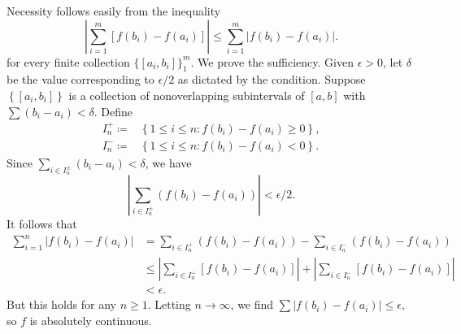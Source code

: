 \begin{exercise}{7.7}
  Necessity follows easily from the inequality
  \[
    \left| \sum_{i=1}^m \left[ f(b_i) - f(a_i) \right] \right|
    \le \sum_{i=1}^m \left| f(b_i) - f(a_i) \right|.
  \]
  for every finite collection $\{[a_i, b_i]\}_1^m$. 
  We prove the sufficiency.
  Given $\epsilon > 0$,
  let $\delta$ be the value corresponding to $\epsilon/2$
  as dictated by the condition.
  Suppose $\left\{ [a_i, b_i] \right\}$ is a collection of
  nonoverlapping subintervals of $[a, b]$
  with $\sum \left( b_i - a_i \right) < \delta$.
  Define
  \[
    \begin{aligned}
      I^+_n \coloneqq &\left\{ 1 \le i \le n : f(b_i) - f(a_i) \ge 0 \right\}, \\
      I^-_n \coloneqq &\left\{ 1 \le i \le n : f(b_i) - f(a_i) < 0 \right\}.
    \end{aligned}
  \]
  Since $\sum_{i \in I^{\pm}_n} \left( b_i - a_i \right) < \delta$,
  we have
  \[
    \left| \sum_{i \in I^\pm_n} \left( f(b_i) - f(a_i) \right) \right|
    < \epsilon/2.
  \]
  It follows that
  \[
    \begin{aligned}
      \sum_{i=1}^n \left| f(b_i) - f(a_i) \right|
      &=\sum_{i \in I^+_n} \left( f(b_i) - f(a_i) \right)
      - \sum_{i \in I^-_n} \left( f(b_i) - f(a_i) \right) \\
      &\le \left| \sum_{i \in I^+_n} \left[ f(b_i) - f(a_i) \right] \right|
      + \left| \sum_{i \in I^-_n} \left[ f(b_i) - f(a_i) \right] \right| \\
      &< \epsilon.
    \end{aligned}
  \]
  But this holds for any $n \ge 1$. 
  Letting $n \rightarrow \infty$, 
  we find $\sum \left| f(b_i) - f(a_i) \right| \le \epsilon$, 
  so $f$ is absolutely continuous.
\end{exercise}

